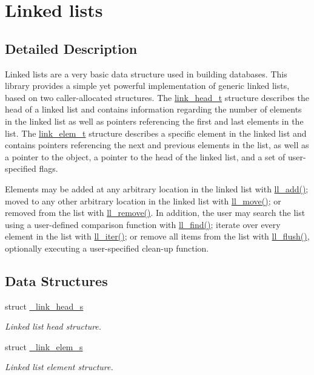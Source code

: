 \hypertarget{group__dbprim__link}{
\section{Linked lists}
\label{group__dbprim__link}
}


\subsection{Detailed Description}
Linked lists are a very basic data structure used in building databases. This library provides a simple yet powerful implementation of generic linked lists, based on two caller-allocated structures. The \hyperlink{group__dbprim__link_ga0}{link\_\-head\_\-t} structure describes the head of a linked list and contains information regarding the number of elements in the linked list as well as pointers referencing the first and last elements in the list. The \hyperlink{group__dbprim__link_ga1}{link\_\-elem\_\-t} structure describes a specific element in the linked list and contains pointers referencing the next and previous elements in the list, as well as a pointer to the object, a pointer to the head of the linked list, and a set of user-specified flags.

Elements may be added at any arbitrary location in the linked list with \hyperlink{group__dbprim__link_ga6}{ll\_\-add()}; moved to any other arbitrary location in the linked list with \hyperlink{group__dbprim__link_ga7}{ll\_\-move()}; or removed from the list with \hyperlink{group__dbprim__link_ga8}{ll\_\-remove()}. In addition, the user may search the list using a user-defined comparison function with \hyperlink{group__dbprim__link_ga9}{ll\_\-find()}; iterate over every element in the list with \hyperlink{group__dbprim__link_ga10}{ll\_\-iter()}; or remove all items from the list with \hyperlink{group__dbprim__link_ga11}{ll\_\-flush()}, optionally executing a user-specified clean-up function.

\subsection*{Data Structures}
\begin{CompactItemize}
\item 
struct \hyperlink{struct__link__head__s}{\_\-link\_\-head\_\-s}
\begin{CompactList}\small\item\em Linked list head structure. \item\end{CompactList}\item 
struct \hyperlink{struct__link__elem__s}{\_\-link\_\-elem\_\-s}
\begin{CompactList}\small\item\em Linked list element structure. \item\end{CompactList}\end{CompactItemize}
